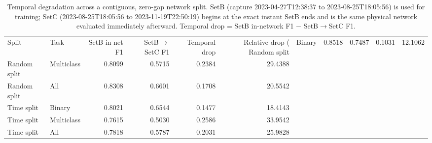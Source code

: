 \begin{table}
\caption{Temporal degradation across a contiguous, zero-gap network split. SetB (capture 2023-04-27T12:38:37 to 2023-08-25T18:05:56) is used for training; SetC (2023-08-25T18:05:56 to 2023-11-19T22:50:19) begins at the exact instant SetB ends and is the same physical network evaluated immediately afterward. Temporal drop = SetB in-network F1 $-$ SetB$\to$SetC F1.}
\label{tab:q2_temporal_setB_setC}
\begin{tabular}{llrrrr}
\toprule
Split & Task & SetB in-net F1 & SetB$\to$SetC F1 & Temporal drop & Relative drop (%
\midrule
Random split & Binary & 0.8518 & 0.7487 & 0.1031 & 12.1062 \\
Random split & Multiclass & 0.8099 & 0.5715 & 0.2384 & 29.4388 \\
Random split & All & 0.8308 & 0.6601 & 0.1708 & 20.5542 \\
Time split & Binary & 0.8021 & 0.6544 & 0.1477 & 18.4143 \\
Time split & Multiclass & 0.7615 & 0.5030 & 0.2586 & 33.9542 \\
Time split & All & 0.7818 & 0.5787 & 0.2031 & 25.9828 \\
\bottomrule
\end{tabular}
\end{table}
